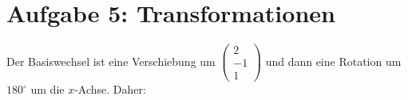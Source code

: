 \documentclass[a4paper]{scrartcl}
\begin{document}
\section*{Aufgabe 5: Transformationen}



Der Basiswechsel ist eine Verschiebung um $\begin{pmatrix}2\\-1\\1\end{pmatrix}$
und dann eine Rotation um $180^\circ$ um die $x$-Achse. Daher:
\end{document}
